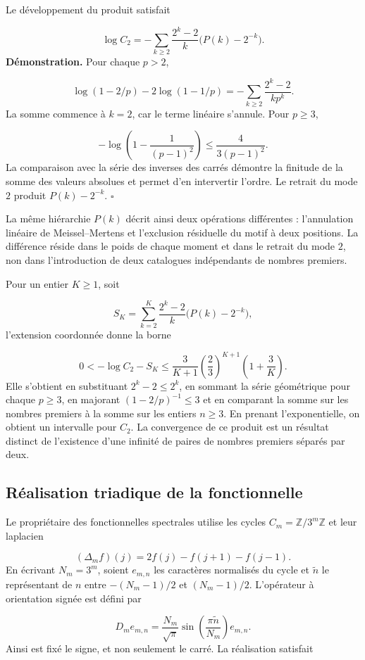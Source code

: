 Le développement du produit satisfait

\[
\log C_2=-\sum_{k\ge2}\frac{2^k-2}{k}\bigl(P(k)-2^{-k}\bigr).
\]
\textbf{Démonstration.} Pour chaque $p>2$,

\[
\log(1-2/p)-2\log(1-1/p)
=-\sum_{k\ge2}\frac{2^k-2}{kp^k}.
\]
La somme commence à $k=2$, car le terme linéaire s’annule. Pour \(p\ge3\),

\[
-\log\left(1-\frac1{(p-1)^2}\right)\le\frac4{3(p-1)^2}.
\]
La comparaison avec la série des inverses des carrés démontre la finitude de la somme des valeurs absolues et permet d'en intervertir l'ordre. Le retrait du mode $2$ produit $P(k)-2^{-k}$. \hfill\(\square\)

La même hiérarchie $P(k)$ décrit ainsi deux opérations différentes : l’annulation linéaire de Meissel–Mertens et l’exclusion résiduelle du motif à deux positions. La différence réside dans le poids de chaque moment et dans le retrait du mode $2$, non dans l’introduction de deux catalogues indépendants de nombres premiers.

Pour un entier \(K\ge1\), soit

\[
S_K=\sum_{k=2}^K\frac{2^k-2}{k}\bigl(P(k)-2^{-k}\bigr),
\]
l'extension coordonnée donne la borne

\[
0<-\log C_2-S_K
\le\frac3{K+1}\left(\frac23\right)^{K+1}\left(1+\frac3K\right).
\]
Elle s'obtient en substituant $2^k-2\le2^k$, en sommant la série géométrique pour chaque $p\ge3$, en majorant $(1-2/p)^{-1}\le3$ et en comparant la somme sur les nombres premiers à la somme sur les entiers $n\ge3$. En prenant l'exponentielle, on obtient un intervalle pour $C_2$. La convergence de ce produit est un résultat distinct de l'existence d'une infinité de paires de nombres premiers séparés par deux.

\subsection{Réalisation triadique de la fonctionnelle}
Le propriétaire des fonctionnelles spectrales utilise les cycles $C_m=\mathbb Z/3^m\mathbb Z$ et leur laplacien

\[
(\Delta_mf)(j)=2f(j)-f(j+1)-f(j-1).
\]
En écrivant \(N_m=3^m\), soient \(e_{m,n}\) les caractères normalisés du cycle et \(\widetilde n\) le représentant de \(n\) entre \(-(N_m-1)/2\) et \((N_m-1)/2\). L'opérateur à orientation signée est défini par

\[
D_m e_{m,n}=\frac{N_m}{\sqrt{\pi}}
\sin\left(\frac{\pi\widetilde n}{N_m}\right)e_{m,n}.
\]
Ainsi est fixé le signe, et non seulement le carré. La réalisation satisfait


